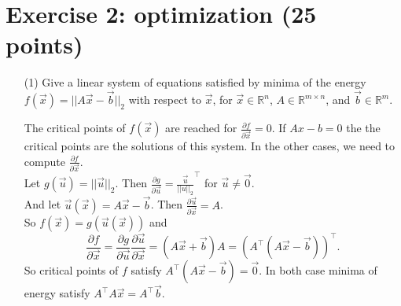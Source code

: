 \section{Exercise 2: optimization  \normalsize \textnormal(25 points)} 

\begin{itemize}
\item[(1)] Give a linear system of equations satisfied by minima of the energy $f(\vec{x}) = ||A\vec{x}-\vec{b}||_2$ with respect to $\vec{x}$, for $\vec{x} \in \mathds{R}^n$, $A \in \mathds{R}^{m \times n}$, and $\vec{b} \in \mathds{R}^m$.
\begin{correction}
     The critical points of $f(\vec{x})$ are reached for $\frac{\partial f}{\partial \vec{x}} = 0$.\newline
    \newline
    If $Ax - b = 0$ the the critical points are the solutions of this system.\newline
    \newline
    In the other cases, we need to compute $\frac{\partial f}{\partial \vec{x}}$. \\
    Let $g(\vec{u}) = ||\vec{u}||_2$. Then $\frac{\partial g}{\partial \vec{u}} = \frac{\vec{u}}{||u||_2}^\top$ for $\vec{u} \neq \vec{0}$. \\
    And let $\vec{u}(\vec{x}) = A\vec{x} - \vec{b}$. Then $\frac{\partial \vec{u}}{\partial \vec{x}} = A$.\\
    So $f(\vec{x}) = g(\vec{u}(\vec{x}))$ and
    $$ \frac{\partial f}{\partial \vec{x}} = \frac{\partial g}{\partial \vec{u}} \frac{\partial \vec{u}}{\partial \vec{x}} = (A\vec{x} + \vec{b})A = \left(A^\top(A\vec{x} - \vec{b})\right)^\top \text{.}$$
    So critical points of $f$ satisfy $A^\top (A\vec{x}  -\vec{b}) = \vec{0}$. \newline 
    \newline
    In both case minima of energy satisfy $A^\top A\vec{x} = A^\top\vec{b}$.  
\end{correction}
 

\end{itemize}
